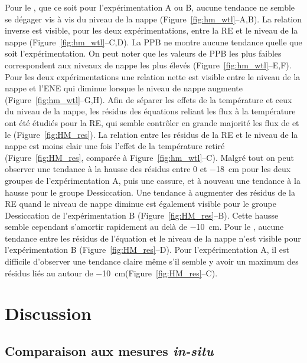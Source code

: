 Pour le \chh, que ce soit pour l'expérimentation A ou B, aucune tendance ne semble se dégager vis à vis du niveau de la nappe (Figure~\ref{fig:hm_wtl}--A,B).
La relation inverse est visible, pour les deux expérimentations, entre la RE et le niveau de la nappe (Figure~\ref{fig:hm_wtl}--C,D).
La PPB ne montre aucune tendance quelle que soit l'expérimentation.
On peut noter que les valeurs de PPB les plus faibles correspondent aux niveaux de nappe les plus élevés (Figure~\ref{fig:hm_wtl}--E,F).
Pour les deux expérimentations une relation nette est visible entre le niveau de la nappe et l'ENE qui diminue lorsque le niveau de nappe augmente (Figure~\ref{fig:hm_wtl}--G,H).
Afin de séparer les effets de la température et ceux du niveau de la nappe, les résidus des équations reliant les flux à la température ont été étudiés pour la RE, qui semble contrôler en grande majorité les flux de \coo et le \chh (Figure~\ref{fig:HM_res}).
La relation entre les résidus de la RE et le niveau de la nappe est moins clair une fois l'effet de la température retiré (Figure~\ref{fig:HM_res}, comparée à Figure~\ref{fig:hm_wtl}--C).
Malgré tout on peut observer une tendance à la hausse des résidus entre 0 et \SI{-18}{\centi\metre} pour les deux groupes de l'expérimentation A, puis une cassure, et à nouveau une tendance à la hausse pour le groupe Dessiccation.
Une tendance à augmenter des résidus de la RE quand le niveau de nappe diminue est également visible pour le groupe Dessiccation de l'expérimentation B (Figure~\ref{fig:HM_res}--B).
Cette hausse semble cependant s'amortir rapidement au delà de \SI{-10}{\centi\metre}.
Pour le \chh, aucune tendance entre les résidus de l'équation et le niveau de la nappe n'est visible pour l'expérimentation B (Figure~\ref{fig:HM_res}--D).
Pour l'expérimentation A, il est difficile d'observer une tendance claire même s'il semble y avoir un maximum des résidus liés au \chh autour de \SI{-10}{\centi\metre}(Figure~\ref{fig:HM_res}--C).


\section{Discussion}

\subsection{Comparaison aux mesures \textit{in-situ}}
\subsubsection{\chh}

